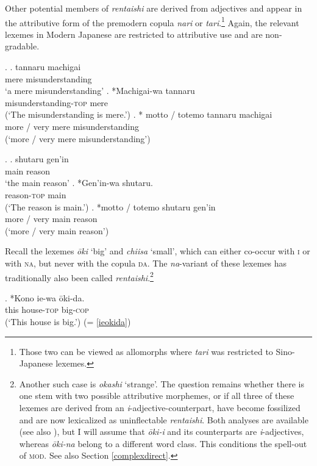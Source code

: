 Other potential members of \textit{rentaishi} are derived from adjectives and appear in the attributive form of the premodern copula \textit{nari} or \textit{tari}.\footnote{Those two can be viewed as allomorphs where \textit{tari} was restricted to Sino-Japanese lexemes.} Again, the relevant lexemes in Modern Japanese are restricted to attributive use and are non-gradable.

\ex. \ag. tannaru machigai\\
mere misunderstanding\\
`a mere misunderstanding'
\bg. *Machigai-wa tannaru\\
misunderstanding-\textsc{top} mere\\
(`The misunderstanding is mere.’)
\cg. * motto / totemo tannaru machigai\\
more / very mere misunderstanding\\
(`more / very mere misunderstanding’)

\ex. \ag. shutaru gen'in\\
main reason\\
`the main reason'
\bg. *Gen'in-wa shutaru.\\
reason-\textsc{top} main\\
(`The reason is main.’)
\cg. *motto / totemo shutaru gen'in\\
more / very main reason\\
(`more / very main reason’)

\newpage
Recall the lexemes \textit{ōki} `big' and \textit{chiisa} `small’, which can either co-occur with \textsc{i} or with \textsc{na}, but never with the copula \textsc{da}. The \textit{na}-variant of these lexemes has traditionally also been called \textit{rentaishi}.\footnote{Another such case is \textit{okashi} `strange’. The question remains whether there is one stem with two possible attributive morphemes, or if all three of these lexemes are derived from an \textit{i}-adjective-counterpart, have become fossilized and are now lexicalized as uninflectable \textit{rentaishi}. Both analyses are available (see also \citealt[Footnote 15]{oshima:2021:nihongo}), but I will assume that \textit{ōki-i} and its counterparts are \textit{i}-adjectives, whereas \textit{ōki-na} belong to a different word class. This conditions the spell-out of \textsc{mod}. See also Section \ref{complexdirect}.}

\exg. *Kono ie-wa ōki-da.\\
this house-\textsc{top} big-\textsc{cop}\\
(`This house is big.’) \null \hfill (= \ref{ieokida})

